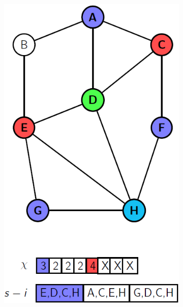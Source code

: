 \documentclass[14pt]{extreport}
\begin{document}
		\begin{figure}[t]
        \centering
        \begin{subfigure}[t]{0.45\textwidth}
            \centering
            \includegraphics[width=0.9\linewidth]{diagrams/dp1.PNG}
            \subcaption{}
        \end{subfigure}
        \hfill
        \begin{subfigure}[t]{0.45\textwidth}
            \centering

\end{subfigure}
\end{figure}
\end{document}
